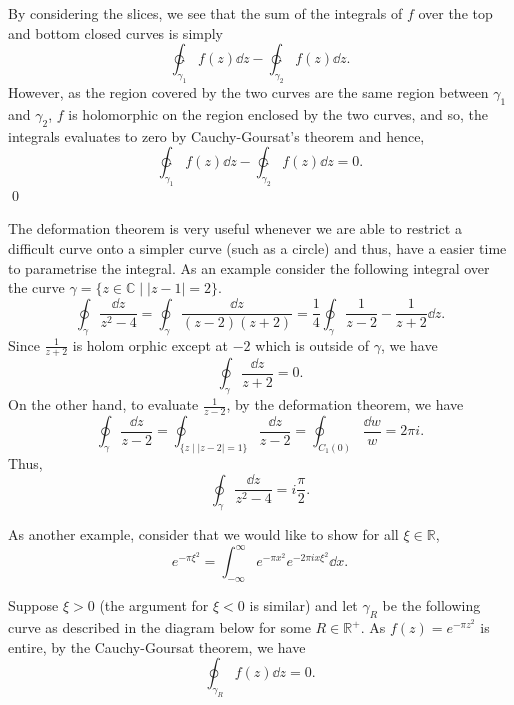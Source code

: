 \documentclass[
]{article}
\theoremstyle{definition}
\theoremstyle{definition}
\begin{document}
\begin{center}

\end{center}

By considering the slices, we see that the sum of the integrals of \(f\)
over the top and bottom closed curves is simply
\[\ointctrclockwise_{\gamma_1} f(z) \dd z - \ointctrclockwise_{\gamma_2} f(z) \dd z.\]
However, as the region covered by the two curves are the same region
between \(\gamma_1\) and \(\gamma_2\), \(f\) is holomorphic on the
region enclosed by the two curves, and so, the integrals evaluates to
zero by Cauchy-Goursat's theorem and hence,
\[\ointctrclockwise_{\gamma_1} f(z) \dd z - \ointctrclockwise_{\gamma_2} f(z) \dd z = 0.\]
\qed

The deformation theorem is very useful whenever we are able to restrict
a difficult curve onto a simpler curve (such as a circle) and thus, have
a easier time to parametrise the integral. As an example consider the
following integral over the curve
\(\gamma = \{z \in \mathbb{C} \mid |z - 1| = 2\}\).
\[\oint_\gamma \frac{\dd z}{z^2 - 4} = \oint_\gamma \frac{\dd z}{(z - 2)(z + 2)} 
  = \frac{1}{4}\oint_\gamma \frac{1}{z - 2} - \frac{1}{z + 2} \dd z.\]
Since \(\frac{1}{z + 2}\) is holom orphic except at \(-2\) which is
outside of \(\gamma\), we have \[\oint_\gamma \frac{\dd z}{z + 2} = 0.\]
On the other hand, to evaluate \(\frac{1}{z - 2}\), by the deformation
theorem, we have
\[\oint_\gamma \frac{\dd z}{z - 2} = \oint_{\{z \mid |z - 2| = 1\}} \frac{\dd z}{z - 2} 
  = \oint_{C_1(0)} \frac{\dd w}{w} = 2\pi i.\] Thus,
\[\oint_\gamma \frac{\dd z}{z^2 - 4} = i \frac{\pi}{2}.\]

As another example, consider that we would like to show for all
\(\xi \in \mathbb{R}\),
\[e^{-\pi \xi^2} = \int_{-\infty}^\infty e^{-\pi x^2}e^{-2\pi i x \xi^2} \dd x.\]

Suppose \(\xi > 0\) (the argument for \(\xi <0\) is similar) and let
\(\gamma_R\) be the following curve as described in the diagram below
for some \(R \in \mathbb{R}^+\). As \(f(z) = e^{-\pi z^2}\) is entire,
by the Cauchy-Goursat theorem, we have
\[\oint_{\gamma_R} f(z) \dd z = 0.\]
\end{document}
